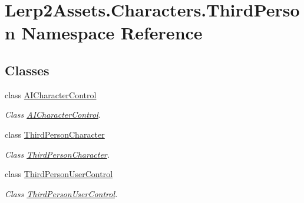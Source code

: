 \hypertarget{namespace_lerp2_assets_1_1_characters_1_1_third_person}{}\section{Lerp2\+Assets.\+Characters.\+Third\+Person Namespace Reference}
\label{namespace_lerp2_assets_1_1_characters_1_1_third_person}
\subsection*{Classes}
\begin{DoxyCompactItemize}
\item 
class \hyperlink{class_lerp2_assets_1_1_characters_1_1_third_person_1_1_a_i_character_control}{A\+I\+Character\+Control}
\begin{DoxyCompactList}\small\item\em Class \hyperlink{class_lerp2_assets_1_1_characters_1_1_third_person_1_1_a_i_character_control}{A\+I\+Character\+Control}. \end{DoxyCompactList}\item 
class \hyperlink{class_lerp2_assets_1_1_characters_1_1_third_person_1_1_third_person_character}{Third\+Person\+Character}
\begin{DoxyCompactList}\small\item\em Class \hyperlink{class_lerp2_assets_1_1_characters_1_1_third_person_1_1_third_person_character}{Third\+Person\+Character}. \end{DoxyCompactList}\item 
class \hyperlink{class_lerp2_assets_1_1_characters_1_1_third_person_1_1_third_person_user_control}{Third\+Person\+User\+Control}
\begin{DoxyCompactList}\small\item\em Class \hyperlink{class_lerp2_assets_1_1_characters_1_1_third_person_1_1_third_person_user_control}{Third\+Person\+User\+Control}. \end{DoxyCompactList}\end{DoxyCompactItemize}
